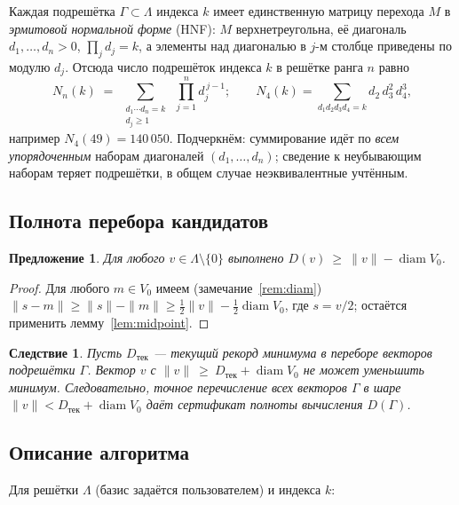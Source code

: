 \documentclass[12pt]{article}
\theoremstyle{plain}
\newtheorem{proposition}{Предложение}
\newtheorem{corollary}{Следствие}
\theoremstyle{definition}
\theoremstyle{remark}
\DeclareMathOperator{\diam}{diam}
\begin{document}
Каждая подрешётка $\Gamma\subset\Lambda$ индекса $k$ имеет единственную
матрицу перехода $M$ в \emph{эрмитовой нормальной форме} (HNF): $M$
верхнетреугольна, её диагональ $d_1,\dots,d_n>0$, $\prod_j d_j=k$, а элементы
над диагональю в $j$-м столбце приведены по модулю $d_j$. Отсюда число
подрешёток индекса $k$ в решётке ранга $n$ равно
\[
N_n(k)\;=\;\sum_{\substack{d_1\cdots d_n=k\\ d_j\ge 1}}\;
\prod_{j=1}^{n} d_j^{\,j-1};
\qquad
N_4(k)=\sum_{d_1d_2d_3d_4=k} d_2\,d_3^2\,d_4^3,
\]
например $N_4(49)=140\,050$. Подчеркнём: суммирование идёт по \emph{всем
упорядоченным} наборам диагоналей $(d_1,\dots,d_n)$; сведение к неубывающим
наборам теряет подрешётки, в общем случае неэквивалентные учтённым.

\subsection{Полнота перебора кандидатов}

\begin{proposition}\label{prop:bound}
Для любого $v\in\Lambda\setminus\{0\}$ выполнено
$D(v)\ \ge\ \|v\|-\diam V_0$.
\end{proposition}

\begin{proof}
Для любого $m\in V_0$ имеем (замечание~\ref{rem:diam})
$\|s-m\|\ge\|s\|-\|m\|\ge\tfrac12\|v\|-\tfrac12\diam V_0$, где $s=v/2$;
остаётся применить лемму~\ref{lem:midpoint}.
\end{proof}

\begin{corollary}\label{cor:window}
Пусть $D_{\text{тек}}$ --- текущий рекорд минимума в переборе векторов
подрешётки $\Gamma$. Вектор $v$ с
$\|v\|\ \ge\ D_{\text{тек}}+\diam V_0$
не может уменьшить минимум. Следовательно, точное перечисление всех векторов
$\Gamma$ в шаре $\|v\|<D_{\text{тек}}+\diam V_0$ даёт сертификат полноты
вычисления $D(\Gamma)$.
\end{corollary}

\subsection{Описание алгоритма}

Для решётки $\Lambda$ (базис задаётся пользователем) и индекса $k$:
\end{document}
